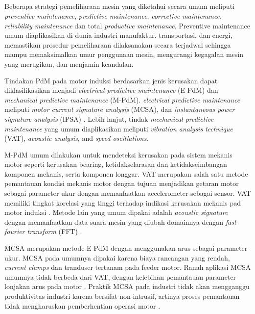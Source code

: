 \documentclass{elsinta}
\begin{document}
\subsection{\ExistingConditionTitle}
Beberapa strategi pemeliharaan mesin yang diketahui secara umum meliputi \textit{preventive maintenance}, \textit{predictive maintenance}, \textit{corrective maintenance}, \textit{reliability maintenance} dan total \textit{productive maintenance}\cite{1.2.4, 1.2.5}. Preventive maintenance umum diaplikasikan di dunia industri manufaktur, transportasi, dan energi, memastikan prosedur pemeliharaan dilaksanakan secara terjadwal sehingga mampu memaksimalkan umur penggunaan mesin, mengurangi kegagalan mesin yang merugikan, dan menjamin keandalan\cite{1.2.6}.

Tindakan PdM pada motor induksi berdasarkan jenis kerusakan dapat diklasifikasikan menjadi \textit{electrical predictive maintenance}  (E-PdM) dan \textit{mechanical predictive maintenance} (M-PdM). \textit{electrical predictive maintenance} meliputi \textit{motor current signature analysis} (MCSA), dan \textit{instantaneous power signature analysis} (IPSA) \cite{1.1.10}. Lebih lanjut, tindak \textit{mechanical predictive maintenance} yang umum diaplikasikan meliputi \textit{vibration analysis technique} (VAT), \textit{acoustic analysis}, and \textit{speed oscillations}\cite{1.1.10}. 

M-PdM umum dilakukan untuk mendeteksi kerusakan pada sistem mekanis motor seperti kerusakan bearing, ketidakselarasan dan ketidakseimbangan komponen mekanis, serta komponen longgar. VAT merupakan salah satu metode pemantauan kondisi mekanis motor dengan tujuan menjadikan getaran motor sebagai parameter ukur dengan memanfaatkan accelerometer sebagai sensor. VAT memiliki tingkat korelasi yang tinggi terhadap indikasi kerusakan mekanis pad motor induksi \cite{1.2.1}. Metode lain yang umum dipakai adalah \textit{acoustic signature} dengan memanfaatkan data suara mesin yang diubah domainnya dengan \textit{fast-fourier transform} (FFT) \cite{1.1.16, 1.1.17}.

MCSA merupakan metode E-PdM dengan menggunakan arus sebagai parameter ukur. MCSA pada umumnya dipakai karena biaya rancangan yang rendah, \textit{current clamps} dan tranduser tertanam pada feeder motor. Ranah aplikasi MCSA umumnya tidak berbeda dari VAT, dengan kelebihan pemantauan parameter lonjakan arus pada motor \cite{1.1.15}. Praktik MCSA pada industri tidak akan mengganggu produktivitas industri karena bersifat non-intrusif, artinya proses pemantauan tidak mengharuskan pemberhentian operasi motor \cite{1.1.18}.
\end{document}
